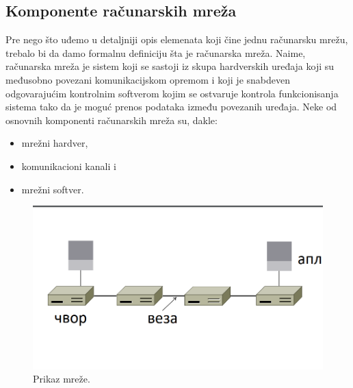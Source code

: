 \documentclass[a4paper]{article}
\begin{document}
\subsection{Komponente računarskih mreža}
Pre nego što uđemo u detaljniji opis elemenata koji čine jednu računarsku mrežu, trebalo bi da damo formalnu definiciju šta je računarska mreža. Naime, računarska mreža je sistem koji se sastoji iz skupa hardverskih uređaja koji su međusobno povezani komunikacijskom opremom i koji je snabdeven odgovarajućim kontrolnim softverom kojim se ostvaruje kontrola funkcionisanja sistema tako da je moguć prenos podataka između povezanih uređaja. Neke od osnovnih komponenti računarskih mreža su, dakle:
\begin{itemize}
\item mrežni hardver, 
\item komunikacioni kanali i 
\item mrežni softver.
\end{itemize}

\begin{figure}[h!]
\begin{center}
\includegraphics[scale=0.5]{pictures/PrMr.png}
\end{center}
\caption{Prikaz mreže.}
\label{fig:PrMr}
\end{figure}
\end{document}
